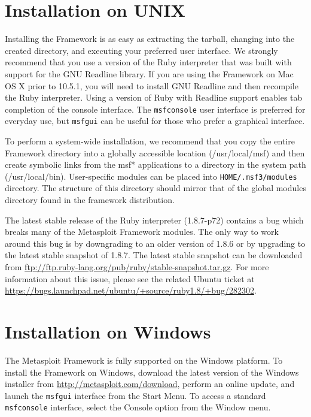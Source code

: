 \documentclass{report}
\begin{document}
    \section{Installation on UNIX}
    \label{INSTALL-UNIX}
\par
Installing the Framework is as easy as extracting the tarball, changing into the
created directory, and executing your preferred user interface. We strongly
recommend that you use a version of the Ruby interpreter that was built with
support for the GNU Readline library. If you are using the Framework on Mac OS
X prior to 10.5.1, you will need to install GNU Readline and then recompile the Ruby
interpreter. Using a version of Ruby with Readline support enables tab completion
of the console interface. The \texttt{msfconsole} user interface is preferred for everyday
use, but \texttt{msfgui} can be useful for those who prefer a graphical interface.

\par
To perform a system-wide installation, we recommend that you copy the entire
Framework directory into a globally accessible location (/usr/local/msf) and
then create symbolic links from the msf* applications to a directory in the
system path (/usr/local/bin). User-specific modules can be placed into
\texttt{HOME/.msf3/modules} directory. The structure of this directory should
mirror that of the global modules directory found in the framework
distribution.

\par
The latest stable release of the Ruby interpreter (1.8.7-p72) contains a bug which
breaks many of the Metasploit Framework modules. The only way to work around this
bug is by downgrading to an older version of 1.8.6 or by upgrading to the latest
stable snapshot of 1.8.7. The latest stable snapshot can be downloaded from
\url{ftp://ftp.ruby-lang.org/pub/ruby/stable-snapshot.tar.gz}. For more information
about this issue, please see the related Ubuntu ticket at
\url{https://bugs.launchpad.net/ubuntu/+source/ruby1.8/+bug/282302}.



    \section{Installation on Windows}
    \label{INSTALL-WIN32}

\par
The Metasploit Framework is fully supported on the Windows platform. To install the
Framework on Windows, download the latest version of the Windows installer from
\url{http://metasploit.com/download}, perform an online update, and launch the
\texttt{msfgui} interface from the Start Menu. To access a standard \texttt{msfconsole}
interface, select the Console option from the Window menu.
\end{document}
